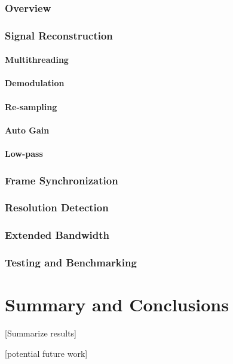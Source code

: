 \documentclass[a4paper,12pt,twoside,openright]{report}
\begin{document}
\subsection{Overview}

\subsection{Signal Reconstruction}

\subsubsection{Multithreading}

\subsubsection{Demodulation}

\subsubsection{Re-sampling}

\subsubsection{Auto Gain}

\subsubsection{Low-pass}

\subsection{Frame Synchronization}

\subsection{Resolution Detection}

\subsection{Extended Bandwidth}

\subsection{Testing and Benchmarking}

\chapter{Summary and Conclusions} 

[Summarize results]

[potential future work]

\appendix
\singlespacing

 
 
\end{document}
